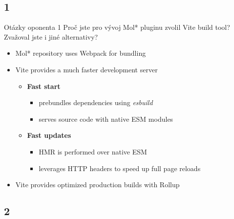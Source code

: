 \documentclass[
]{beamer}
\begin{document}
\subsection[1]{1}

\begin{frame}{}
  \begin{block}{Otázky oponenta 1}
    Proč jste pro vývoj Mol* pluginu zvolil Vite build tool? Zvažoval jste i jiné alternativy?
  \end{block}
  \begin{itemize}
    \item Mol* repository uses Webpack for bundling
    \item Vite provides a much faster development server
    \begin{itemize}
      \item \textbf{Fast start}
      \begin{itemize}
          \item prebundles dependencies using \textit{esbuild}
          \item serves source code with native ESM modules
      \end{itemize}
      \item \textbf{Fast updates}
      \begin{itemize}
          \item HMR is performed over native ESM
          \item leverages HTTP headers to speed up full page reloads
      \end{itemize}
    \end{itemize}
    \item Vite provides optimized production builds with Rollup
  \end{itemize}
\end{frame}

\subsection[2]{2}
\end{document}
